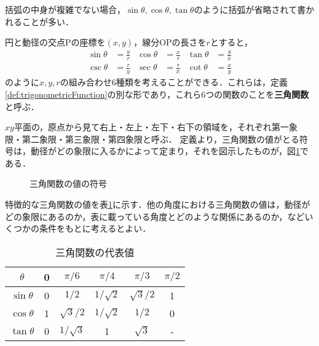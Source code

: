 \begin{rem*}
	括弧の中身が複雑でない場合，$\sin\theta, \cos\theta, \tan\theta$のように括弧が省略されて書かれることが多い．
\end{rem*}
\begin{rem*}
	円と動径の交点Pの座標を$(x,y)$，線分OPの長さを$r$とすると，
	\begin{align*}
		\sin\theta &= \frac{y}{r} & \cos\theta &= \frac{x}{r} & \tan\theta &= \frac{y}{x} \\[5pt]
		\csc\theta &= \frac{r}{y} & \sec\theta &= \frac{r}{x} & \cot\theta &= \frac{x}{y}
	\end{align*}
	のように$x, y, r$の組み合わせ6種類を考えることができる．これらは，定義\ref{def:trigonometricFunction}の別な形であり，これら6つの関数のことを\textbf{三角関数}と呼ぶ．
\end{rem*}
\begin{example*}
	$xy$平面の，原点から見て右上・左上・左下・右下の領域を，それぞれ第一象限・第二象限・第三象限・第四象限と呼ぶ．
	定義より，三角関数の値がとる符号は，動径がどの象限に入るかによって定まり，それを図示したものが，図\ref{fig:triFuncSign}である．
	
	\vspace*{5cm}
	\begin{figure}[!h]
		\centering
		\caption{三角関数の値の符号}
		\label{fig:triFuncSign}
	\end{figure}
\end{example*}
\begin{example*}
	特徴的な三角関数の値を表\ref{table:triFuncValue}に示す．他の角度における三角関数の値は，動径がどの象限にあるのか，表に載っている角度とどのような関係にあるのか，などいくつかの条件をもとに考えるとよい．
	
	\begin{table}[!h]
		\centering
		\caption{三角関数の代表値}
		\label{table:triFuncValue}
		\begin{tabular}{c|ccccc}
			$\theta$ & 0 & $\pi/6$ & $\pi/4$ & $\pi/3$ & $\pi/2$ \\
			\hline
			$\sin\theta$ & 0 & $1/2$ & $1/\sqrt{2}$ & $\sqrt{3}/2$ & 1 \\
			\hline
			$\cos\theta$ & 1 & $\sqrt{3}/2$ & $1/\sqrt{2}$ & $1/2$ & 0 \\
			\hline
			$\tan\theta$ & 0 & $1/\sqrt{3}$ & 1 & $\sqrt{3}$ & -
		\end{tabular}
	\end{table}
\end{example*}

